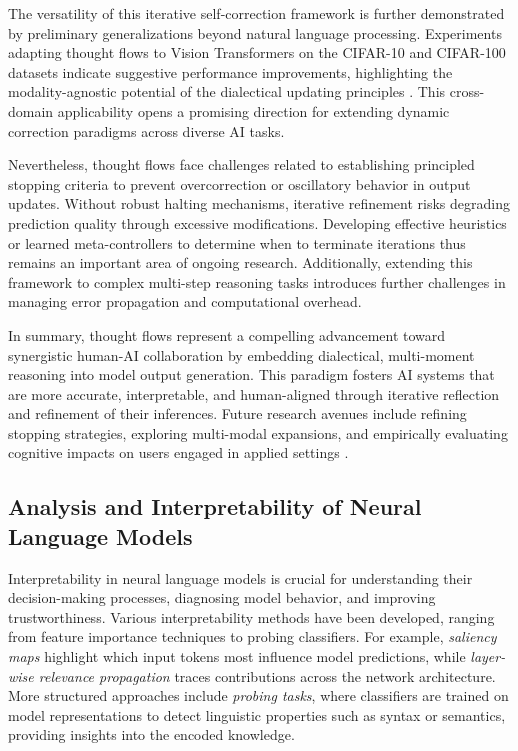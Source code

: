\documentclass[sigconf]{acmart}
\begin{document}
The versatility of this iterative self-correction framework is further demonstrated by preliminary generalizations beyond natural language processing. Experiments adapting thought flows to Vision Transformers on the CIFAR-10 and CIFAR-100 datasets indicate suggestive performance improvements, highlighting the modality-agnostic potential of the dialectical updating principles \cite{ref43}. This cross-domain applicability opens a promising direction for extending dynamic correction paradigms across diverse AI tasks.

Nevertheless, thought flows face challenges related to establishing principled stopping criteria to prevent overcorrection or oscillatory behavior in output updates. Without robust halting mechanisms, iterative refinement risks degrading prediction quality through excessive modifications. Developing effective heuristics or learned meta-controllers to determine when to terminate iterations thus remains an important area of ongoing research. Additionally, extending this framework to complex multi-step reasoning tasks introduces further challenges in managing error propagation and computational overhead.

In summary, thought flows represent a compelling advancement toward synergistic human-AI collaboration by embedding dialectical, multi-moment reasoning into model output generation. This paradigm fosters AI systems that are more accurate, interpretable, and human-aligned through iterative reflection and refinement of their inferences. Future research avenues include refining stopping strategies, exploring multi-modal expansions, and empirically evaluating cognitive impacts on users engaged in applied settings \cite{ref43}.

\subsection{Analysis and Interpretability of Neural Language Models}

Interpretability in neural language models is crucial for understanding their decision-making processes, diagnosing model behavior, and improving trustworthiness. Various interpretability methods have been developed, ranging from feature importance techniques to probing classifiers. For example, \emph{saliency maps} highlight which input tokens most influence model predictions, while \emph{layer-wise relevance propagation} traces contributions across the network architecture. More structured approaches include \emph{probing tasks}, where classifiers are trained on model representations to detect linguistic properties such as syntax or semantics, providing insights into the encoded knowledge.
\end{document}
